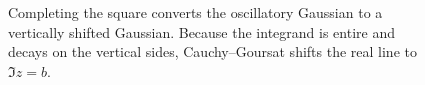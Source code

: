 \begin{figure}[ht]
\centering
{}
\caption{Completing the square converts the oscillatory Gaussian to a vertically shifted Gaussian. Because the integrand is entire and decays on the vertical sides, Cauchy--Goursat shifts the real line to $\Im z=b$.}
\label{fig:cp-iv-0114-gaussian-shift-rectangle}
\end{figure}
